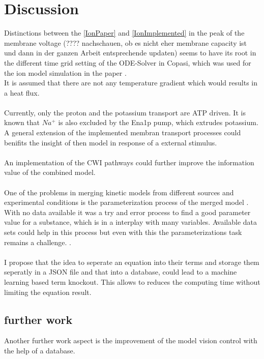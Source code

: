 \section{Discussion}
Distinctions between the \ref{IonPaper} and \ref{IonImplemented} in the peak of the membrane voltage (???? nachschauen, ob es nicht eher membrane capacity ist und dann in der ganzen Arbeit entsprechende updaten) seems to have its root in the different time grid setting of the ODE-Solver in Copasi, which was used for the ion model simulation in the paper \cite{Gerber_2016}.\\
It is assumed that there are not any temperature gradient which would results in a heat flux.\\\\
Currently, only the proton and the potassium transport are ATP driven. It is known that $Na^+$ is also excluded by the Ena1p pump, which extrudes potassium. A general extension of the implemented membran transport processes could benifits the insight of then model in response of a external stimulus.\\\\
An implementation of the CWI pathways could further improve the information value of the combined model.\\\\
One of the problems in merging kinetic models from different sources and experimental conditions is the parameterization process of the merged model \cite{Wang2017}. With no data available it was a try and error process to find a good parameter value for a substance, which is in a interplay with many variables. Available data sets could help in this process but even with this the parameterizations task remains a challenge. \cite{Ke_2013}. \\\\
I propose that the idea to seperate an equation into their terms and storage them seperatly in a JSON file and that into a database, could lead to a machine learning based term knockout. This allows to reduces the computing time without limiting the equation result.\\

\subsection{further work}
Another further work aspect is the improvement of the model vision control with the help of a database.\\\\
